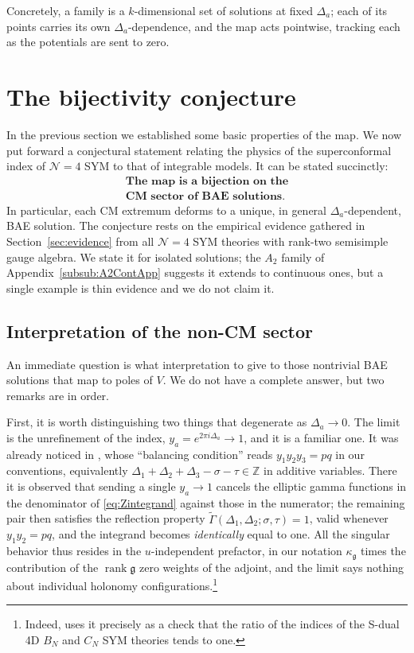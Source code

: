 \documentclass[aps, prx, nofootinbib, twocolumn,amsfonts,amsmath,amssymb,mathtools,superscriptaddress,preprintnumbers,floatfix,reprint]{revtex4-2}
\newcommand{\alg}{\mathfrak{g}}
\DeclareMathOperator{\rank}{rank}
\begin{document}
Concretely, a family is a $k$-dimensional set of solutions at fixed
$\Delta_a$; each of its points carries its own $\Delta_a$-dependence, and the
map acts pointwise, tracking each as the potentials are sent to zero.

\section{The bijectivity conjecture}
\label{sec:conjecture}

In the previous section we established some basic properties of the map.
We now put forward a conjectural statement relating the physics of the
superconformal index of $\mathcal{N}=4$ SYM to that of integrable models. It
can be stated succinctly:
\begin{gather*}
  \textbf{The map is a bijection on the}\\
  \textbf{CM sector of BAE solutions.}
\end{gather*}
In particular, each CM extremum deforms to a unique, in general
$\Delta_a$-dependent, BAE solution. The conjecture rests on the empirical
evidence gathered in Section~\ref{sec:evidence} from all $\mathcal{N}=4$ SYM theories
with rank-two semisimple gauge algebra. We state it for isolated solutions; the
$A_2$ family of Appendix~\ref{subsub:A2ContApp} suggests it extends to
continuous ones, but a single example is thin evidence and we do not claim it.

\subsection{Interpretation of the non-CM sector}
\label{sub:sectors}

An immediate question is what interpretation to give to those nontrivial BAE
solutions that map to poles of $V$. We do not have a complete answer, but two
remarks are in order.

First, it is worth distinguishing two things that degenerate as
$\Delta_a\to0$. The limit is the unrefinement of the index,
$y_a=e^{2\pi i\Delta_a}\to1$, and it is a familiar one. It was already noticed
in \cite[Sec.~2]{Spiridonov:2010qv}, whose ``balancing condition'' reads
$y_1y_2y_3=pq$ in our conventions, equivalently
$\Delta_1+\Delta_2+\Delta_3-\sigma-\tau\in \mathbb{Z}$ in additive variables. There
it is observed that sending a single $y_a\to1$ cancels the elliptic gamma
functions in the denominator of \eqref{eq:Zintegrand} against those in the
numerator; the remaining pair then satisfies the reflection property
$\tilde\Gamma(\Delta_1,\Delta_2;\sigma,\tau)=1$, valid whenever
$y_1y_2=pq$, and the integrand becomes \emph{identically} equal to one. All the
singular behavior thus resides in the $u$-independent prefactor, in our
notation $\kappa_\alg$ times the contribution of the $\rank\alg$ zero
weights of the adjoint, and the limit says nothing about individual holonomy
configurations.\footnote{Indeed, \cite{Spiridonov:2010qv} uses it precisely as a check
that the ratio of the indices of the S-dual 4D $B_N$ and
$C_N$ SYM theories tends to one.}
\end{document}
